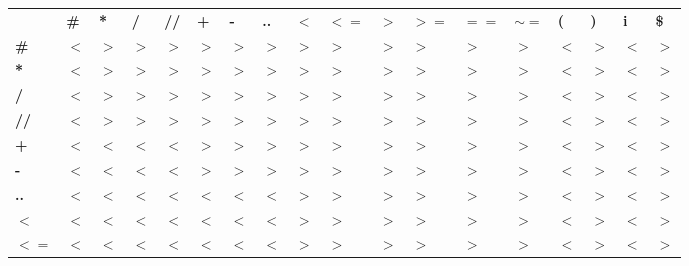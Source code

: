 \documentclass[a4paper, 11pt]{article}
\begin{document}
    \begin{center}
        \begin{tabular}{!{\vrule width 2pt} >{}P{5.5mm} !{\vrule width 2pt} P{5.5mm} | P{5.5mm} | P{5.5mm} | P{5.5mm} | P{5.5mm} | P{5.5mm} | P{5.5mm} | P{5.5mm} | P{5.5mm} | P{5.5mm} | P{5.5mm} | P{5.5mm} | P{5.5mm} | P{5.5mm} | P{5.5mm} | P{5.5mm} | P{5.5mm} !{\vrule width 2pt}}
            \Xhline{5\arrayrulewidth}
            & \textbf{\#} & \textbf{*} & \textbf{/} & \textbf{//} & \textbf{+} & \textbf{-} & \textbf{..} & $\bm{<}$ & $\bm{<=}$ & $\bm{>}$ & $\bm{>=}$ & $\bm{==}$ & $\bm{\sim=}$ & \textbf{(} & \textbf{)} & \textbf{i} & \textbf{\$} \\ [0.6ex]
            \Xhline{5\arrayrulewidth}
            \textbf{\#}      & $<$ & $>$ & $>$ & $>$ & $>$ & $>$ & $>$ & $>$ & $>$ & $>$ & $>$ & $>$ & $>$ & $<$ & $>$ & $<$ & $>$ \\ [0.5ex]
            \hline
            \textbf{*}       & $<$ & $>$ & $>$ & $>$ & $>$ & $>$ & $>$ & $>$ & $>$ & $>$ & $>$ & $>$ & $>$ & $<$ & $>$ & $<$ & $>$ \\ [0.5ex]
            \hline
            \textbf{/}       & $<$ & $>$ & $>$ & $>$ & $>$ & $>$ & $>$ & $>$ & $>$ & $>$ & $>$ & $>$ & $>$ & $<$ & $>$ & $<$ & $>$ \\ [0.5ex]
            \hline
            \textbf{//}      & $<$ & $>$ & $>$ & $>$ & $>$ & $>$ & $>$ & $>$ & $>$ & $>$ & $>$ & $>$ & $>$ & $<$ & $>$ & $<$ & $>$ \\ [0.5ex]
            \hline
            \textbf{+}       & $<$ & $<$ & $<$ & $<$ & $>$ & $>$ & $>$ & $>$ & $>$ & $>$ & $>$ & $>$ & $>$ & $<$ & $>$ & $<$ & $>$ \\ [0.5ex]
            \hline
            \textbf{-}       & $<$ & $<$ & $<$ & $<$ & $>$ & $>$ & $>$ & $>$ & $>$ & $>$ & $>$ & $>$ & $>$ & $<$ & $>$ & $<$ & $>$ \\ [0.5ex]
            \hline
            \textbf{..}      & $<$ & $<$ & $<$ & $<$ & $<$ & $<$ & $<$ & $>$ & $>$ & $>$ & $>$ & $>$ & $>$ & $<$ & $>$ & $<$ & $>$ \\ [0.5ex]
            \hline
            $\bm{<}$     & $<$ & $<$ & $<$ & $<$ & $<$ & $<$ & $<$ & $>$ & $>$ & $>$ & $>$ & $>$ & $>$ & $<$ & $>$ & $<$ & $>$ \\ [0.5ex]
            \hline
            $\bm{<=}$    & $<$ & $<$ & $<$ & $<$ & $<$ & $<$ & $<$ & $>$ & $>$ & $>$ & $>$ & $>$ & $>$ & $<$ & $>$ & $<$ & $>$ \\ [0.5ex]
            \hline

\end{tabular}
\end{center}
\end{document}
